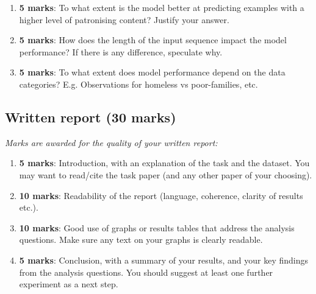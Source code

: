 \documentclass[11pt]{article}
\begin{document}
\begin{enumerate}
    \item \textbf{5 marks}: To what extent is the model better at predicting examples with a higher level of patronising content? Justify your answer.
    \item \textbf{5 marks}: How does the length of the input sequence impact the model performance? If there is any difference, speculate why.
    \item \textbf{5 marks}: To what extent does model performance depend on the data categories? E.g. Observations for homeless vs poor-families, etc.
\end{enumerate}

\subsection{Written report \textbf{(30 marks)}}

\emph{Marks are awarded for the quality of your written report:}

\begin{enumerate}
    \item \textbf{5 marks}: Introduction, with an explanation of the task and the
    dataset. You may want to read/cite the task paper (and any other paper of
    your choosing).
    \item \textbf{10 marks}: Readability of the report (language, coherence, clarity of
    results etc.).
    \item \textbf{10 marks}: Good use of graphs or results tables that address the
    analysis questions. Make sure any text on your graphs is clearly readable.
    \item \textbf{5 marks}: Conclusion, with a summary of your results, and your key
    findings from the analysis questions. You should suggest at least one further
    experiment as a next step.
\end{enumerate}
\end{document}
